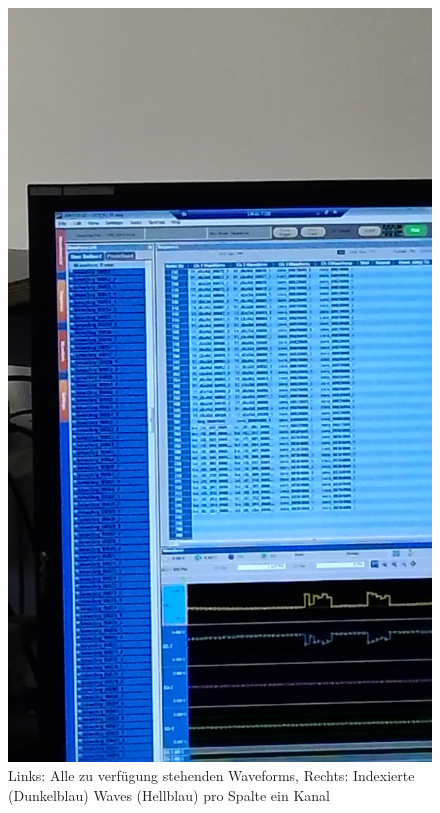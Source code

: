 \documentclass[DIN, pagenumber=false, fontsize=11pt]{scrartcl}
\begin{document}
\begin{figure}[h]
\begin{center}
 \includegraphics[width=\textheight,angle=270]{pictures/P_20150225_143734.jpg} \qquad
 \caption{Links: Alle zu verfügung stehenden Waveforms, Rechts: Indexierte (Dunkelblau) Waves (Hellblau) pro Spalte ein Kanal}
\end{center}
\end{figure}
\end{document}
